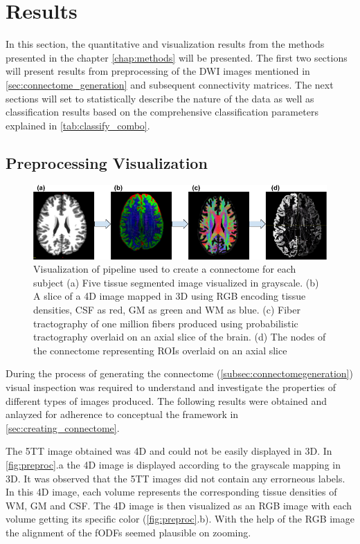 \documentclass[msthesis.tex]{subfiles}
\begin{document}
\chapter{Results}
In this section, the quantitative and visualization results from the methods presented in the chapter \ref{chap:methods} will be presented. The first two sections will present results from preprocessing of the DWI images mentioned in \autoref{sec:connectome_generation} and subsequent connectivity matrices. The next sections will set to statistically describe the nature of the data as well as classification results based on the comprehensive classification parameters explained in \autoref{tab:classify_combo}.

\section{Preprocessing Visualization}
\begin{figure}
    \centering
    \includegraphics[width=\textwidth]{images/Preprocessing_pipeline.png}
    \caption{Visualization of pipeline used to create a connectome for each subject (a) Five tissue segmented image visualized in grayscale. (b) A slice of a 4D image mapped in 3D using RGB encoding tissue densities, CSF as red, GM as green and WM as blue. (c) Fiber tractography of one million fibers produced using probabilistic tractography overlaid on an axial slice of the brain. (d) The nodes of the connectome representing ROIs overlaid on an axial slice}
    \label{fig:preproc}
\end{figure}

During the process of generating the connectome (\autoref{subsec:connectomegeneration}) visual inspection was required to understand and investigate the properties of different types of images produced. The following results were obtained and anlayzed for adherence to conceptual the framework in \autoref{sec:creating_connectome}. 

The 5TT image obtained was 4D and could not be easily displayed in 3D. In \autoref{fig:preproc}.a the 4D image is displayed according to the grayscale mapping in 3D. It was observed that the 5TT images did not contain any errorneous labels. In this 4D image, each volume represents the corresponding tissue densities of WM, GM and CSF. The 4D image is then visualized as an RGB image with each volume getting its specific color (\autoref{fig:preproc}.b). With the help of the RGB image the alignment of the fODFs seemed plausible on zooming.
\end{document}
